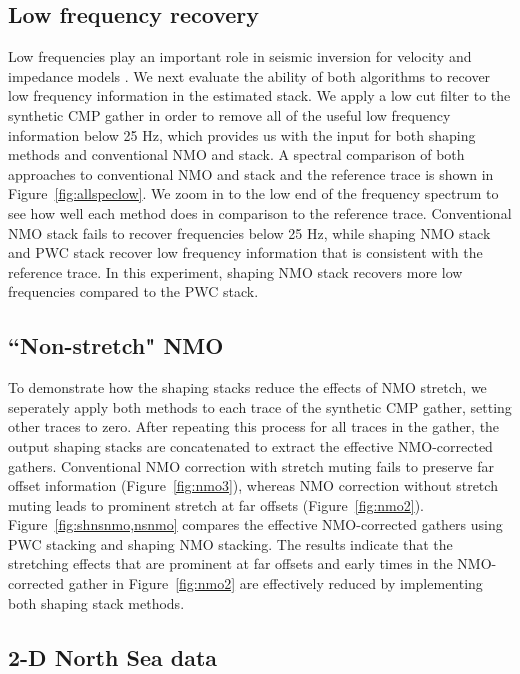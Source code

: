 


\subsection{Low frequency recovery}
Low frequencies play an important role in seismic inversion for velocity and impedance models \cite[]{kroode}.
We next evaluate the ability of both algorithms to recover low frequency information in the 
estimated stack. We apply a low cut filter to the synthetic CMP gather
in order to remove all of the useful low frequency information below 25 Hz, which provides us with the input for both shaping
methods and conventional NMO and stack. A spectral comparison of both approaches to conventional NMO and stack
and the reference trace is shown in Figure~\ref{fig:allspeclow}. We zoom in to the low end of the frequency spectrum
to see how well each method does in comparison to the reference trace. Conventional NMO stack fails
to recover frequencies below 25 Hz, while shaping NMO stack and PWC stack recover 
low frequency information that is consistent with the reference trace. In this experiment, shaping NMO stack 
recovers more low frequencies compared to the PWC stack. 
 

\subsection{``Non-stretch" NMO}
To demonstrate how the shaping stacks reduce the effects of NMO stretch, 
we seperately apply both methods to each trace of the synthetic CMP gather, setting other traces to zero. After repeating this process 
for all traces in the gather, the output shaping stacks are concatenated to extract the effective NMO-corrected gathers.
Conventional NMO correction with stretch muting fails to preserve far offset information (Figure~\ref{fig:nmo3}), 
whereas NMO correction without stretch muting leads to prominent stretch at far offsets (Figure~\ref{fig:nmo2}). 
Figure~\ref{fig:shnsnmo,nsnmo} compares the effective NMO-corrected gathers using PWC stacking and 
shaping NMO stacking. The results indicate that the stretching effects that are prominent at far offsets and early times in the NMO-corrected gather 
in Figure~\ref{fig:nmo2} are effectively reduced by implementing both shaping stack methods.


\subsection{2-D North Sea data}

